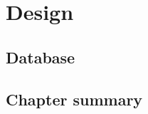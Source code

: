 \chapter{Design}
\label{chap:Design}

\section{Database}
\label{sec:Database}

\section{Chapter summary}
\label{sec:Chapter summary}
